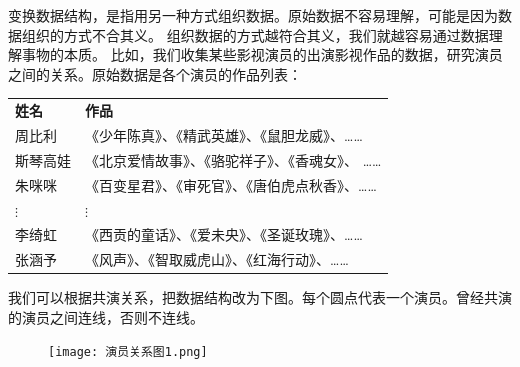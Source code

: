 \documentclass[12pt,UTF8]{ctexbook}
\begin{document}
变换数据结构，是指用另一种方式组织数据。原始数据不容易理解，可能是因为数据组织的方式不合其义。
组织数据的方式越符合其义，我们就越容易通过数据理解事物的本质。
比如，我们收集某些影视演员的出演影视作品的数据，研究演员之间的关系。原始数据是各个演员的作品列表：
\begin{center}
    \begin{tabular}{ p{4em}<{\centering} !{\color{white} \vrule width 2pt} p{22em}<{\centering} }
         \textbf{姓名} & \textbf{作品} \\ [0.5ex] 
         周比利 & 《少年陈真》、《精武英雄》、《鼠胆龙威》、…… \\  
         斯琴高娃 & 《北京爱情故事》、《骆驼祥子》、《香魂女》、 …… \\  
         朱咪咪 & 《百变星君》、《审死官》、《唐伯虎点秋香》、…… \\  
         $\vdots$ & $\vdots$ \\  
         李绮虹 & 《西贡的童话》、《爱未央》、《圣诞玫瑰》、…… \\  
         张涵予 & 《风声》、《智取威虎山》、《红海行动》、…… \\  
    \end{tabular}
\end{center}

我们可以根据共演关系，把数据结构改为下图。每个圆点代表一个演员。曾经共演的演员之间连线，否则不连线。
\begin{figure}[H] %
    \vspace{8pt}
    \centering
    \texttt{[image: 演员关系图1.png]}
\end{figure}
\end{document}
